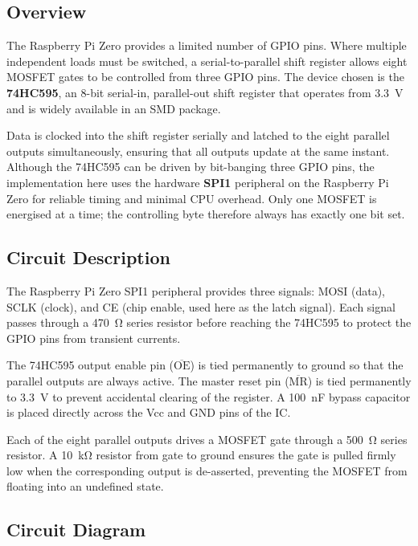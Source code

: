 \documentclass[12pt,letterpaper]{article}
\begin{document}
	\subsection{Overview}
	
	The Raspberry Pi Zero provides a limited number of GPIO pins. Where multiple independent
	loads must be switched, a serial-to-parallel shift register allows eight MOSFET gates to
	be controlled from three GPIO pins. The device chosen is the \textbf{74HC595}, an
	8-bit serial-in, parallel-out shift register that operates from \SI{3.3}{\volt} and is
	widely available in an SMD package.
	
	Data is clocked into the shift register serially and latched to the eight parallel outputs
	simultaneously, ensuring that all outputs update at the same instant. Although the
	74HC595 can be driven by bit-banging three GPIO pins, the implementation here uses the
	hardware \textbf{SPI1} peripheral on the Raspberry Pi Zero for reliable timing and
	minimal CPU overhead. Only one MOSFET is energised at a time; the controlling byte
	therefore always has exactly one bit set.
	
	\subsection{Circuit Description}
	
	The Raspberry Pi Zero SPI1 peripheral provides three signals: MOSI (data), SCLK (clock),
	and CE (chip enable, used here as the latch signal). Each signal passes through a
	\SI{470}{\ohm} series resistor before reaching the 74HC595 to protect the GPIO pins
	from transient currents.
	
	The 74HC595 output enable pin ($\overline{\text{OE}}$) is tied permanently to ground so
	that the parallel outputs are always active. The master reset pin ($\overline{\text{MR}}$)
	is tied permanently to \SI{3.3}{\volt} to prevent accidental clearing of the register.
	A \SI{100}{\nano\farad} bypass capacitor is placed directly across the Vcc and GND
	pins of the IC.
	
	Each of the eight parallel outputs drives a MOSFET gate through a \SI{500}{\ohm}
	series resistor. A \SI{10}{\kilo\ohm} resistor from gate to ground ensures the gate
	is pulled firmly low when the corresponding output is de-asserted, preventing the
	MOSFET from floating into an undefined state.
	
	\subsection{Circuit Diagram}
	
\end{document}
